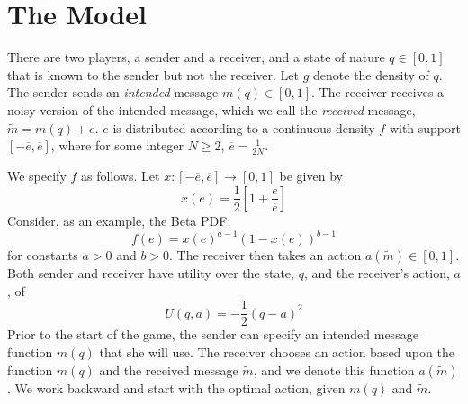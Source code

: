 \documentclass[12pt]{article}
\begin{document}
\onehalfspacing


\section{The Model}

There are two players, a sender and a receiver, and a state of nature $q\in [ 0,1]$ that is known to the sender but not the receiver. Let $g$ denote the density of $q$. The sender sends an \textit{intended} message $m(q)\in [ 0,1]$. The receiver receives a noisy version of the intended message, which we call the \textit{received} message, $\widetilde{m} =m(q)+e$. $e$ is distributed according to a continuous density $ f$ with support $[-\overline{e },\overline{e }]$, where for some integer $N\geq2$, $\overline{e}=\frac{1}{2N}$. 

We specify $f$ as follows. Let $x:[-\overline{e},\overline{e}]\rightarrow[0,1]$ be given by
\begin{equation}
	x(e)=\frac{1}{2}\left[1+\frac{e}{\overline{e}}\right]
\end{equation}
Consider, as an example, the Beta PDF:
\begin{equation}
	f(e)=x(e)^{a-1}(1-x(e))^{b-1}
\end{equation}
for constants $a>0$ and $b>0$. The receiver then takes an action $a(\widetilde{m})\in[0,1]$. Both sender and receiver have utility over the state, $q$, and the receiver's action, $a$, of 
\begin{equation}
	U(q,a)=-\frac{1}{2}(q-a)^{2}
\end{equation}
Prior to the start of the game, the sender can specify an intended message function $m(q)$ that she will use. The receiver chooses an action based upon the function $m(q)$ and the received message $\widetilde{m}$, and we denote this function $a(\widetilde{m})$. We work backward and start with the optimal action, given $m(q)$ and $\widetilde{m}$.
\end{document}
